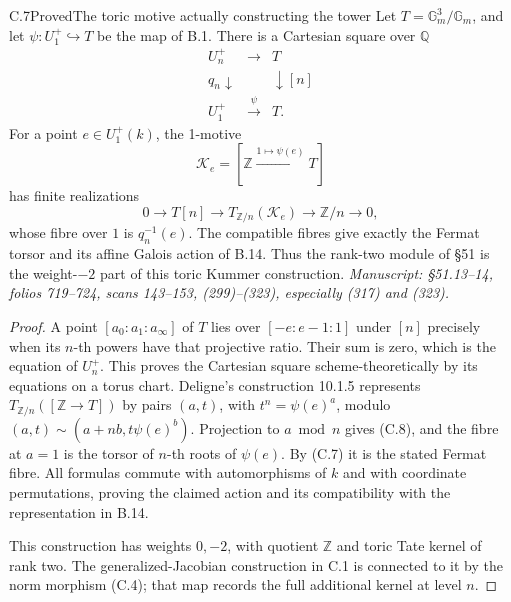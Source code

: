 \begin{statement}{C.7}{Proved}{The toric motive actually constructing the tower}
Let \(T=\mathbb G_m^3/\mathbb G_m\), and let
\(\psi:U_1^+\hookrightarrow T\) be the map of B.1. There is a
Cartesian square over \(\mathbb Q\)
\[
\begin{array}{ccc}
 U_n^+&\longrightarrow&T\\
 {\scriptstyle q_n}\downarrow&&\downarrow{\scriptstyle[n]}\\
 U_1^+&\xrightarrow{\ \psi\ }&T.
\end{array}                                                   \tag{C.7}
\]
For a point \(e\in U_1^+(k)\), the 1-motive
\[
 \mathcal K_e=[\mathbb Z\xrightarrow{1\mapsto\psi(e)}T]
\]
has finite realizations
\[
 0\to T[n]\to T_{\mathbb Z/n}(\mathcal K_e)\to\mathbb Z/n\to0,
                                                               \tag{C.8}
\]
whose fibre over \(1\) is \(q_n^{-1}(e)\).
The compatible fibres give exactly the Fermat torsor and its
affine Galois action of B.14. Thus the rank-two module of \S51
is the weight-\(-2\) part of this toric Kummer construction.
\emph{Manuscript: \S51.13--14, folios 719--724, scans 143--153,
(299)--(323), especially (317) and (323).}
\end{statement}
\begin{proof}
A point \([a_0:a_1:a_\infty]\) of \(T\) lies over
\([-e:e-1:1]\) under \([n]\) precisely when its \(n\)-th powers
have that projective ratio. Their sum is zero, which is the
equation of \(U_n^+\). This proves the Cartesian square
scheme-theoretically by its equations on a torus chart.
Deligne's construction 10.1.5 represents
\(T_{\mathbb Z/n}([\mathbb Z\to T])\) by pairs
\((a,t)\), with \(t^n=\psi(e)^a\), modulo
\((a,t)\sim(a+nb,t\psi(e)^b)\). Projection to \(a\bmod n\)
gives (C.8), and the fibre at \(a=1\) is the torsor of
\(n\)-th roots of \(\psi(e)\). By (C.7) it is the stated
Fermat fibre. All formulas commute with automorphisms of \(k\)
and with coordinate permutations, proving the claimed action
and its compatibility with the representation in B.14.

This construction has weights \(0,-2\), with quotient
\(\mathbb Z\) and toric Tate kernel of rank two.
The generalized-Jacobian construction in C.1 is connected to it
by the norm morphism (C.4); that map records the full additional
kernel at level \(n\).
\end{proof}

